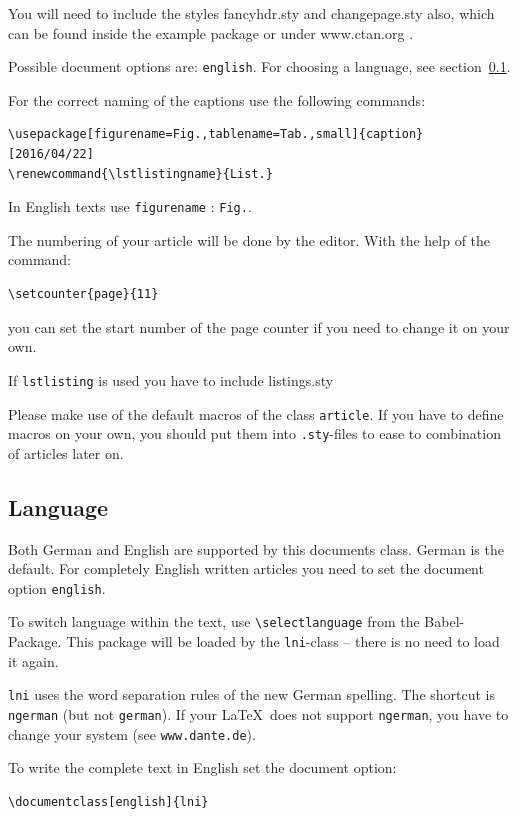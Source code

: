 \documentclass[english]{lni}
\renewcommand{\lstlistingname}{List.}    %
\begin{document}
You will need to include the styles fancyhdr.sty and changepage.sty also, which can be found inside the example package or under www.ctan.org . 

Possible document options are: \texttt{english}. For choosing a language, see section~\ref{sprache}.
\clearpage


For the correct naming of the captions use the following commands:

\begin{verbatim}
\usepackage[figurename=Fig.,tablename=Tab.,small]{caption}
[2016/04/22]
\renewcommand{\lstlistingname}{List.}  
\end{verbatim}
In English texts use \texttt{figurename} : \texttt{Fig.}. 

The numbering of your article will be done by the editor. With the help of the command:
\begin{verbatim}
\setcounter{page}{11}
\end{verbatim}

you can set the start number of the page counter if you need to change it on your own.

If \texttt{lstlisting} is used you have to include listings.sty  

Please make use of the default macros of the class \texttt{article}. If you have to define macros on your own, you should put them into \texttt{.sty}-files to ease to combination of articles later on.

\subsection{Language}
\label{sprache}

Both German and English are supported by this documents class. German is the default. For completely English written articles you need to set the document option \texttt{english}.

To switch language within the text, use \verb|\selectlanguage| from the Babel-Package. This package will be loaded by the \texttt{lni}-class -- there is no need to load it again.

\texttt{lni} uses the word separation rules of the new German spelling. The shortcut is \texttt{ngerman} (but not \texttt{german}). If your \LaTeX\ does not support \texttt{ngerman}, you have to change your system (see \texttt{www.dante.de}).

To write the complete text in English set the document option:

\begin{verbatim}
\documentclass[english]{lni}
\end{verbatim}
\end{document}
